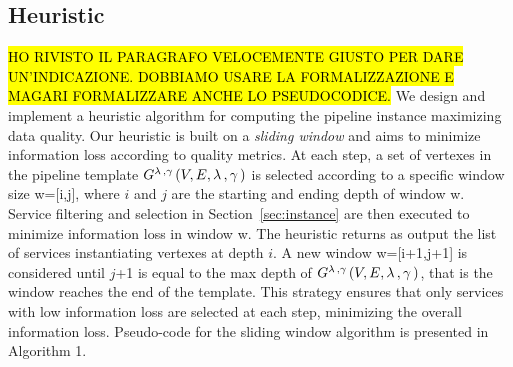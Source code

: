 \subsection{Heuristic}\label{subsec:heuristics}
\hl{HO RIVISTO IL PARAGRAFO VELOCEMENTE GIUSTO PER DARE UN'INDICAZIONE. DOBBIAMO USARE LA FORMALIZZAZIONE E MAGARI FORMALIZZARE ANCHE LO PSEUDOCODICE.} We design and implement a heuristic algorithm for computing the pipeline instance maximizing data quality. Our heuristic is built on a \emph{sliding window} and aims to minimize information loss according to quality metrics. At each step, a set of vertexes in the pipeline template $G^{\lambda\,,\gamma\,}(V,E,\lambda\,,\gamma\,)$ is selected according to a specific window size w=[i,j], where $i$ and $j$ are the starting and ending depth of window w. Service filtering and selection in Section~\ref{sec:instance} are then executed to minimize information loss in window w. The heuristic returns as output the list of services instantiating vertexes at depth $i$. A new window w=[i+1,j+1] is considered until $j$+1 is equal to the max depth of $G^{\lambda\,,\gamma\,}(V,E,\lambda\,,\gamma\,)$, that is the window reaches the end of the template.
This strategy ensures that only services with low information loss are selected at each step, minimizing the overall information loss. Pseudo-code for the sliding window algorithm is presented in Algorithm 1.

